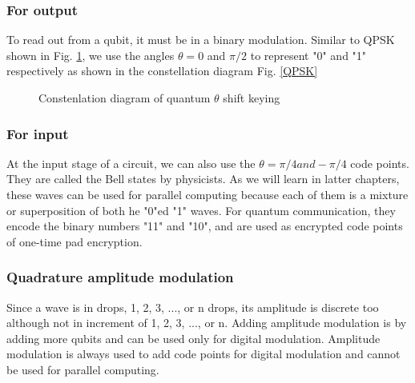 \documentclass{book}
\begin{document}
\subsubsection{For output}
To read out from a qubit, it must be in a binary modulation. Similar to QPSK shown in Fig. \ref{qQPSK}, we use the angles $\theta=0$ and $\pi/2$ to represent "0" and "1" respectively as shown in the constellation diagram Fig. \ref{QPSK} 
\begin{figure}[hp]
\caption{Constenlation diagram of quantum $\theta$ shift keying}
\label{qQPSK}
\end{figure}

\subsubsection{For input}
At the input stage of a circuit, we can also use the $\theta=\pi/4 and -\pi/4$ code points. They are called the Bell states by physicists. As we will learn in latter chapters, these waves can be used for parallel computing because each of them is a mixture or superposition of both he "0"ed "1" waves. For quantum communication, they encode the binary numbers "11" and "10", and are used as encrypted code points of one-time pad encryption.

\subsubsection{Quadrature amplitude modulation}
Since a wave is in drops, 1, 2, 3, ..., or n drops, its amplitude is discrete too although not in increment of 1, 2, 3, ..., or n. Adding amplitude modulation is by adding more qubits and can be used only for digital modulation. Amplitude modulation is always used to add code points for digital modulation and cannot be used for parallel computing.
\end{document}
